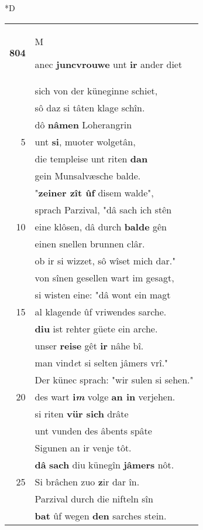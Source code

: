 \documentclass[8pt,a4paper,notitlepage]{article}
\begin{document}
\begin{table}[ht]
\begin{minipage}[t]{0.5\linewidth}
\small
\begin{center}*D
\end{center}
\begin{tabular}{rl}
\textbf{804} & \begin{large}M\end{large}anec \textbf{juncvrouwe} unt \textbf{ir} ander diet\\ 
 & sich von der küneginne schiet,\\ 
 & sô daz si tâten klage schîn.\\ 
 & dô \textbf{nâmen} Loherangrin\\ 
5 & unt \textbf{si}, muoter wolgetân,\\ 
 & die templeise unt riten \textbf{dan}\\ 
 & gein Munsalvæsche balde.\\ 
 & "\textbf{zeiner zît ûf} disem walde",\\ 
 & sprach Parzival, "dâ sach ich stên\\ 
10 & eine klôsen, dâ durch \textbf{balde} gên\\ 
 & einen snellen brunnen clâr.\\ 
 & ob ir si wizzet, sô wîset mich dar."\\ 
 & von sînen gesellen wart im gesagt,\\ 
 & si wisten eine: "dâ wont ein magt\\ 
15 & al klagende ûf vriwendes sarche.\\ 
 & \textbf{diu} ist rehter güete ein arche.\\ 
 & unser \textbf{reise} gêt \textbf{ir} nâhe bî.\\ 
 & man vind\textit{e}t si selten jâmers vrî."\\ 
 & Der künec sprach: "wir sulen si sehen."\\ 
20 & des wart \textbf{i\textit{m}} volge \textbf{an in} verjehen.\\ 
 & si riten \textbf{vür sich} drâte\\ 
 & unt vunden des âbents spâte\\ 
 & Sigunen an ir venje tôt.\\ 
 & \textbf{dâ} \textbf{sach} diu künegîn \textbf{jâmers} nôt.\\ 
25 & Si brâchen zuo \textbf{z}ir dar în.\\ 
 & Parzival durch die nifteln sîn\\ 
 & \textbf{bat} ûf wegen \textbf{den} sarches stein.\\ 

\end{tabular}
\end{minipage}
\end{table}
\end{document}
